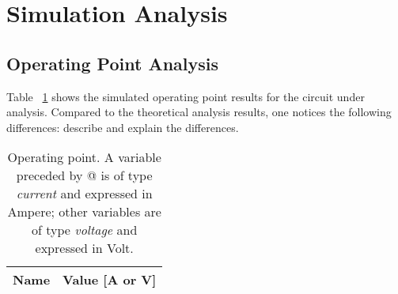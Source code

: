 \section{Simulation Analysis}
\label{sec:simulation}

\subsection{Operating Point Analysis}

Table ~\ref{tab:op} shows the simulated operating point results for the circuit
under analysis. Compared to the theoretical analysis results, one notices the
following differences: describe and explain the differences.

\begin{table}[h]
  \centering
  \begin{tabular}{|l|r|}
    \hline    
    {\bf Name} & {\bf Value [A or V]} \\ \hline
    
  \end{tabular}
  \caption{Operating point. A variable preceded by @ is of type {\em current}
    and expressed in Ampere; other variables are of type {\it voltage} and expressed in
    Volt.}
  \label{tab:op}
\end{table}







